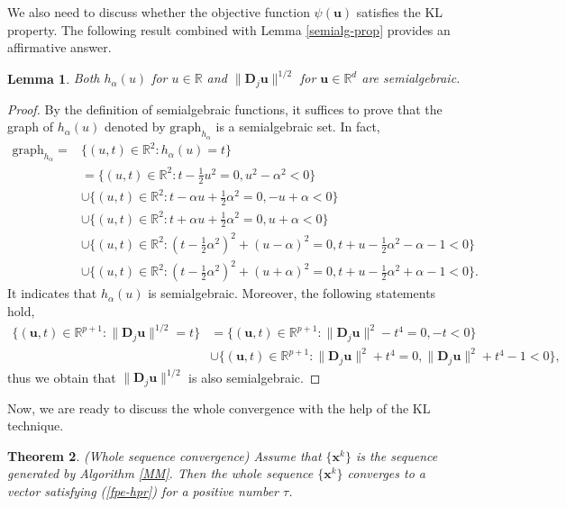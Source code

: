 \documentclass{article}
\newtheorem{theorem}{Theorem}[section]
\newtheorem{lemma}[theorem]{Lemma}
\numberwithin{equation}{section}
\begin{document}
We also need to discuss whether the objective function $\psi(\mathbf{u})$ satisfies the KL property. The following result combined  with Lemma \ref{semialg-prop} provides an affirmative answer.

\begin{lemma}\label{huber-semialg}
Both $h_\alpha(u)$ for $u\in\mathbb{R}$ and $\|\mathbf{D}_j\mathbf{u}\|^{1/2}$ for $\mathbf{u}\in\mathbb{R}^d$ are semialgebraic.
\end{lemma}

\begin{proof}
By the definition of semialgebraic functions, it suffices to prove that the graph of $h_\alpha(u)$ denoted by $\mathrm{graph}_{h_\alpha}$ is
a semialgebraic set. In fact,
$$\begin{aligned}
	\mathrm{graph}_{h_\alpha}=&\{(u, t)\in\mathbb{R}^{2}: h_\alpha(u)=t\}\\
	&=\{(u, t)\in\mathbb{R}^{2}: t-\frac{1}{2}u^2=0, u^2-\alpha^2<0\}\\
	&\cup\{(u, t)\in\mathbb{R}^{2}: t-\alpha u+\frac{1}{2}\alpha^2=0, -u+\alpha<0\}\\
	&\cup\{(u, t)\in\mathbb{R}^{2}: t+\alpha u+\frac{1}{2}\alpha^2=0, u+\alpha<0\}\\
	&\cup\{(u, t)\in\mathbb{R}^{2}: (t-\frac{1}{2}\alpha^2)^2+(u-\alpha)^2=0, t+u-\frac{1}{2}\alpha^2-\alpha-1<0\}\\
	&\cup\{(u, t)\in\mathbb{R}^{2}: (t-\frac{1}{2}\alpha^2)^2+(u+\alpha)^2=0, t+u-\frac{1}{2}\alpha^2+\alpha-1<0\}.
\end{aligned}$$
It indicates that $h_\alpha(u)$ is semialgebraic. Moreover, the following statements hold,
$$\begin{aligned}
		\{(\mathbf{u}, t)\in\mathbb{R}^{p+1}:  \|\mathbf{D}_j\mathbf{u}\|^{1/2}=t\}
		&=\{(\mathbf{u}, t)\in\mathbb{R}^{p+1}:  \|\mathbf{D}_j\mathbf{u}\|^2-t^4=0, -t<0\}\\
		&\cup\{(\mathbf{u}, t)\in\mathbb{R}^{p+1}: \|\mathbf{D}_j\mathbf{u}\|^2+t^4=0, \|\mathbf{D}_j\mathbf{u}\|^2+t^4-1<0\},
	\end{aligned}$$
	thus we obtain that $\|\mathbf{D}_j\mathbf{u}\|^{1/2}$ is also semialgebraic.  \end{proof} 

Now, we are ready to discuss the whole convergence with the help of the KL technique. 

\begin{theorem}\label{who-conv-u}(Whole sequence convergence)
Assume that $\{\mathbf{x}^k\}$ is the sequence generated by Algorithm \ref{MM}. Then the whole sequence $\{\mathbf{x}^k\}$ converges to a vector satisfying (\ref{fpe-hpr}) for a positive number $\tau$.
\end{theorem}
\end{document}
